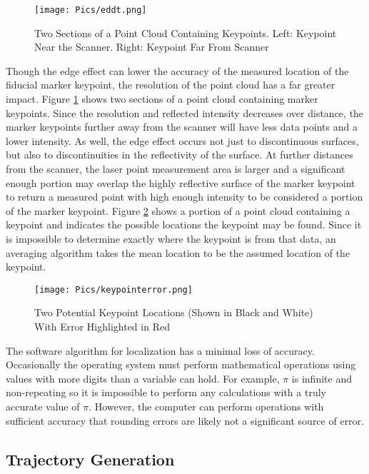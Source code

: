 \begin{figure}
    \centering
    \texttt{[image: Pics/eddt.png]}
    \caption{Two Sections of a Point Cloud Containing Keypoints. Left: Keypoint Near the Scanner. Right: Keypoint Far From Scanner}
    \label{fig:keypointresolution}
\end{figure}

Though the edge effect can lower the accuracy of the measured location of the fiducial marker keypoint, the resolution of the point cloud has a far greater impact. Figure \ref{fig:keypointresolution} shows two sections of a point cloud containing marker keypoints. Since the resolution and reflected intensity decreases over distance, the marker keypoints further away from the scanner will have less data points and a lower intensity. As well, the edge effect occurs not just to discontinuous surfaces, but also to discontinuities in the reflectivity of the surface. At further distances from the scanner, the laser point measurement area is larger and a significant enough portion may overlap the highly reflective surface of the marker keypoint to return a measured point with high enough intensity to be considered a portion of the marker keypoint. Figure \ref{fig:keypointinaccuracy} shows a portion of a point cloud containing a keypoint and indicates the possible locations the keypoint may be found. Since it is impossible to determine exactly where the keypoint is from that data, an averaging algorithm takes the mean location to be the assumed location of the keypoint.\\
\begin{figure}
    \centering
    \texttt{[image: Pics/keypointerror.png]}
    \caption{Two Potential Keypoint Locations (Shown in Black and White) With Error Highlighted in Red}
    \label{fig:keypointinaccuracy}
\end{figure}
The software algorithm for localization has a minimal loss of accuracy. Occasionally the operating system must perform mathematical operations using values with more digits than a variable can hold. For example, $\pi$ is infinite and non-repeating so it is impossible to perform any calculations with a truly accurate value of $\pi$. However, the computer can perform operations with sufficient accuracy that rounding errors are likely not a significant source of error.\\

\subsection{Trajectory Generation}


